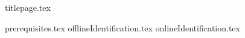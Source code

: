 %






	{titlepage.tex}
	\tableofcontents
	\newpage
	\listoffigures
	\newpage
	\listoflistings
	\newpage
	{prerequisites.tex}
	\newpage
	{offlineIdentification.tex}
	\newpage
	{onlineIdentification.tex}
%	
%	


